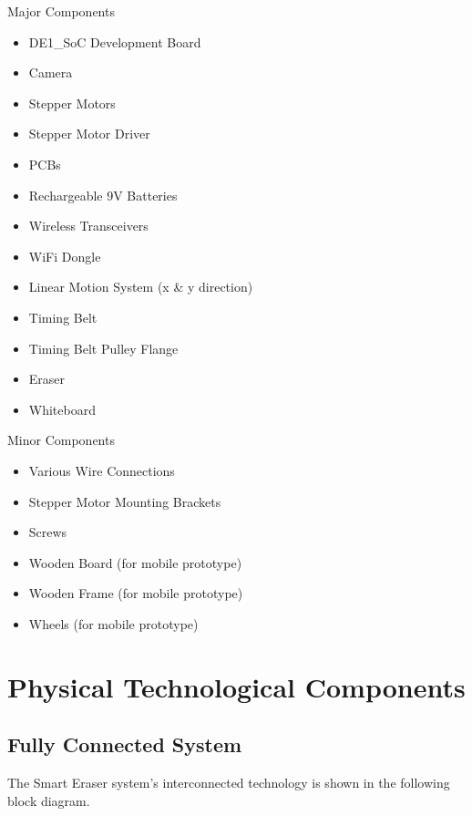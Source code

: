 Major Components
\begin{itemize}
	\item DE1\_SoC Development Board
	\item Camera
	\item Stepper Motors
	\item Stepper Motor Driver
	\item PCBs
	\item Rechargeable 9V Batteries
	\item Wireless Transceivers
	\item WiFi Dongle
	\item Linear Motion System (x \& y direction)
	\item Timing Belt
	\item Timing Belt Pulley Flange
	\item Eraser
	\item Whiteboard \\
\end{itemize}

Minor Components
\begin{itemize}
	\item Various Wire Connections
	\item Stepper Motor Mounting Brackets
	\item Screws
	\item Wooden Board (for mobile prototype)
	\item Wooden Frame (for mobile prototype)
	\item Wheels (for mobile prototype) \\
\end{itemize} \par 

\section{Physical Technological Components}

\subsection{Fully Connected System}

The Smart Eraser system's interconnected technology is shown in the following block diagram. 

